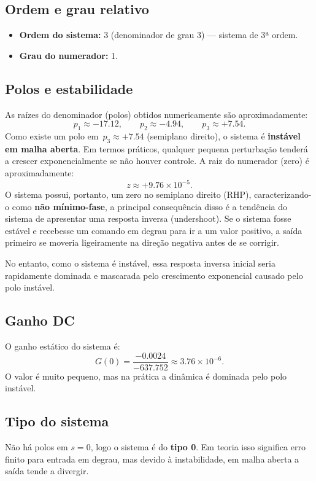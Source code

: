 \documentclass[9pt,a4paper,twocolumn,twoside]{tau-class/tau}
\begin{document}
\subsection{Ordem e grau relativo}
\begin{itemize}
    \item \textbf{Ordem do sistema:} 3 (denominador de grau 3) — sistema de 3ª ordem.
    \item \textbf{Grau do numerador:} 1.
\end{itemize}

\subsection{Polos e estabilidade}
As raízes do denominador (polos) obtidos numericamente são aproximadamente:
\[
p_1 \approx -17.12,\qquad p_2 \approx -4.94,\qquad p_3 \approx +7.54.
\]
Como existe um polo em \(\,p_3 \approx +7.54\) (semiplano direito), o sistema é \textbf{instável em malha aberta}. Em termos práticos, qualquer pequena perturbação tenderá a crescer exponencialmente se não houver controle.
A raiz do numerador (zero) é aproximadamente:
\[
z \approx +9.76\times 10^{-5}.
\]
O sistema possui, portanto, um zero no semiplano direito (RHP), caracterizando-o como \textbf{não mínimo-fase}, a principal consequência disso é a tendência do sistema de apresentar uma resposta inversa (undershoot). Se o sistema fosse estável e recebesse um comando em degrau para ir a um valor positivo, a saída primeiro se moveria ligeiramente na direção negativa antes de se corrigir.

No entanto, como o sistema é instável, essa resposta inversa inicial seria rapidamente dominada e mascarada pelo crescimento exponencial causado pelo polo instável.

\subsection{Ganho DC}
O ganho estático do sistema é:
\[
G(0)=\frac{-0.0024}{-637.752}\approx 3.76\times 10^{-6}.
\]
O valor é muito pequeno, mas na prática a dinâmica é dominada pelo polo instável.

\subsection{Tipo do sistema}
Não há polos em $s=0$, logo o sistema é do \textbf{tipo 0}. Em teoria isso significa erro finito para entrada em degrau, mas devido à instabilidade, em malha aberta a saída tende a divergir.
\end{document}
